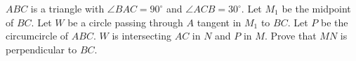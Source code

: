 $ABC$ is a triangle with $\angle BAC=90^{\circ}$ and $\angle ACB=30^{\circ}$. Let $M_1$ be the midpoint of $BC$. Let $W$ be a circle passing through $A$ tangent in $M_1$ to $BC$. Let $P$ be the circumcircle of $ABC$. $W$ is intersecting $AC$ in $N$ and $P$ in $M$. Prove that $MN$ is perpendicular to $BC$.
